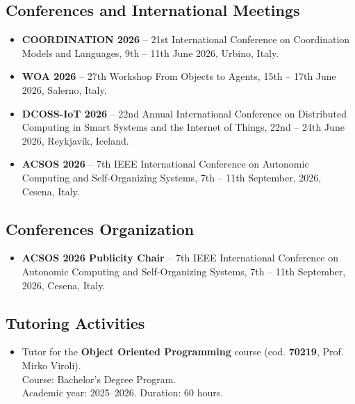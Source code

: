 \documentclass[11pt]{scrartcl}
\newcommand{\confentry}[4]{%
  \item
  \textbf{#1} -- #2, #3, #4.
}
\newcommand{\tutorentry}[6]{%
  \item
  Tutor for the \textbf{#1} course (cod. #2, #3).\\
  Course: #4.\\
  Academic year: #5. Duration: #6.
}
\newenvironment{conferences}
  {%
    \subsection*{Conferences and International Meetings}
    \begin{itemize}
  }
  {%
    \end{itemize}
  }
\newenvironment{tutoring}
  {%
    \subsection*{Tutoring Activities}
    \begin{itemize}
  }
  {%
    \end{itemize}
  }
\newenvironment{conforg}
{%
  \subsection*{Conferences Organization}
  \begin{itemize}
}
{%
  \end{itemize}
}
\begin{document}
%

\begin{conferences}

  \confentry
  {COORDINATION 2026}
  {21st International Conference on Coordination Models and Languages}
  {9th -- 11th June 2026}
  {Urbino, Italy}

  \confentry
  {WOA 2026}
  {27th Workshop From Objects to Agents}
  {15th -- 17th June 2026}
  {Salerno, Italy}

  \confentry
  {DCOSS-IoT 2026}
  {22nd Annual International Conference on Distributed Computing in Smart Systems and the Internet of Things}
  {22nd -- 24th June 2026}
  {Reykjavík, Iceland}

  \confentry
  {ACSOS 2026}
  {7th IEEE International Conference on Autonomic Computing and Self-Organizing Systems}
  {7th -- 11th September, 2026}
  {Cesena, Italy}

\end{conferences}


\begin{conforg}
  \confentry{ACSOS 2026 Publicity Chair}{7th IEEE International Conference on Autonomic Computing and Self-Organizing Systems}{7th -- 11th September, 2026}{Cesena, Italy}
\end{conforg}



%

\begin{tutoring}

  \tutorentry
  {Object Oriented Programming}
  {\textbf{70219}}
  {Prof. Mirko Viroli}
  {Bachelor's Degree Program}
  {2025--2026}
  {60 hours}
%

\end{tutoring}
\end{document}
